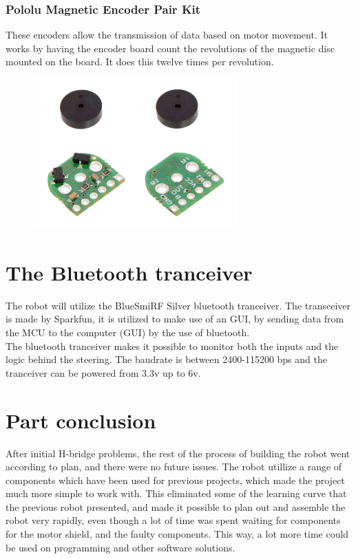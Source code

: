 \subsubsection{Pololu Magnetic Encoder Pair Kit}

These encoders allow the transmission of data based on motor movement. It works by having the encoder board count the revolutions of the magnetic disc mounted on the board. It does this twelve times per revolution.

\begin{figure}[!ht]
	\centering
	\includegraphics[width=0.7\textwidth]{figures/pololuEncoder.jpg}
	\caption{}
	\label{Hardware diagram}
\end{figure}

\section{The Bluetooth tranceiver}
The robot will utilize the BlueSmiRF Silver bluetooth tranceiver. The transceiver is made by Sparkfun, it is utilized to make use of an GUI, by sending data from the MCU to the computer (GUI) by the use of bluetooth.\\ The bluetooth tranceiver makes it possible to monitor both the inputs and the logic behind the steering. The baudrate is between 2400-115200 bps and the tranceiver can be powered from 3.3v up to 6v. 

\section{Part conclusion}
After initial H-bridge problems, the rest of the process of building the robot went according to plan, and there were no future issues. The robot utillize a range of components which have been used for previous projects, which made the project much more simple to work with. This eliminated some of the learning curve that the previous robot presented, and made it possible to plan out and assemble the robot very rapidly, even though a lot of time was spent waiting for components for the motor shield, and the faulty components. This way, a lot more time could be used on programming and other software solutions. 
